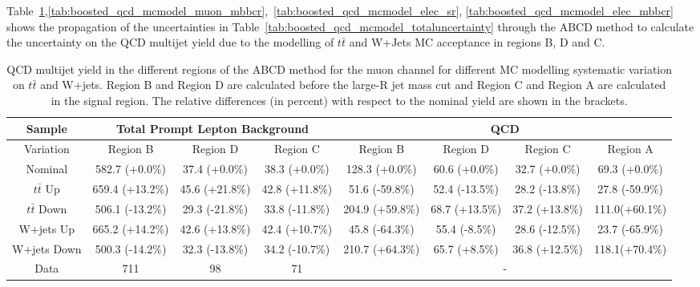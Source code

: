 Table~\ref{tab:boosted_qcd_mcmodel_muon_sr},\ref{tab:boosted_qcd_mcmodel_muon_mbbcr},~\ref{tab:boosted_qcd_mcmodel_elec_sr},
\ref{tab:boosted_qcd_mcmodel_elec_mbbcr} shows the 
propagation of the uncertainties in Table~\ref{tab:boosted_qcd_mcmodel_totaluncertainty}
through the ABCD method to calculate the uncertainty on the QCD multijet yield due
to the modelling of $t\bar{t}$ and W+Jets MC acceptance in regions B, D and C.

%
%
\begin{table}[htbp!]
\begin{tiny}
\begin{center}
\begin{tabular}{c|c|c|c||c|c|c|c}
Sample        &\multicolumn{3}{c||}{Total Prompt Lepton Background}      &\multicolumn{4}{c}{QCD}                                                  \\
\hline  
Variation     & Region B            & Region D        & Region C       & Region B        & Region D       & Region C       & Region A         \\ 
\hline  
Nominal       & 582.7     (+0.0\%)  & 37.4  (+0.0\%)  & 38.3 (+0.0\%)  & 128.3 (+0.0\%)  & 60.6 (+0.0\%)  & 32.7 (+0.0\%)  & 69.3 (+0.0\%) \\ 
\hline
$t\bar{t}$ Up   & 659.4     (+13.2\%) & 45.6  (+21.8\%) & 42.8 (+11.8\%) & 51.6  (-59.8\%) & 52.4 (-13.5\%) & 28.2 (-13.8\%) & 27.8 (-59.9\%) \\
$t\bar{t}$ Down & 506.1     (-13.2\%) & 29.3  (-21.8\%) & 33.8 (-11.8\%) & 204.9 (+59.8\%) & 68.7 (+13.5\%) & 37.2 (+13.8\%) & 111.0(+60.1\%) \\ 
W+jets     Up   & 665.2     (+14.2\%) & 42.6  (+13.8\%) & 42.4 (+10.7\%) & 45.8  (-64.3\%) & 55.4 (-8.5\%)  & 28.6 (-12.5\%) & 23.7 (-65.9\%) \\ 
W+jets     Down & 500.3     (-14.2\%) & 32.3  (-13.8\%) & 34.2 (-10.7\%) & 210.7 (+64.3\%) & 65.7 (+8.5\%)  & 36.8 (+12.5\%) & 118.1(+70.4\%) \\ 
\hline 
\hline 
Data          & 711  & 98   & 71  &\multicolumn{4}{c}{-} \\  
\hline  
\end{tabular}
\end{center}
\caption{QCD multijet yield in the different regions of the ABCD method for the muon channel for 
different MC modelling systematic variation on $t\bar{t}$ and W+jets. Region B and Region D are calculated 
before the large-R jet mass cut and Region C and Region A are calculated in the signal region. The relative 
differences (in percent) with respect to the nominal yield are shown in the brackets.} 
\label{tab:boosted_qcd_mcmodel_muon_sr}
\end{tiny}
\end{table} 
